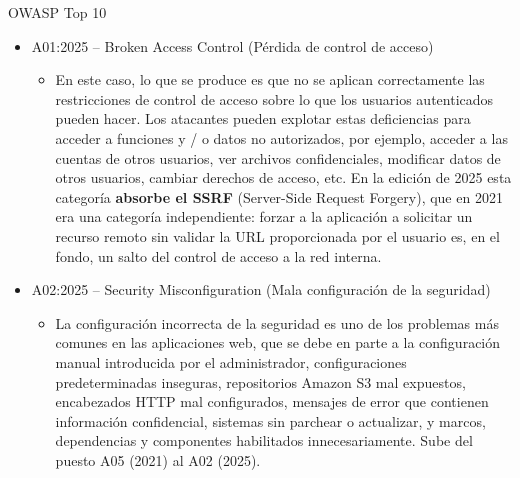 \documentclass[aspectratio=169,10pt]{beamer}
\begin{document}
\begin{frame}[allowframebreaks]{OWASP Top 10}
\small
  \begin{itemize}
  \item A01:2025 -- Broken Access Control (Pérdida de control de acceso)
  \begin{itemize}

  \item En este caso, lo que se produce es que no se aplican correctamente las restricciones de control de acceso sobre lo que los usuarios autenticados pueden hacer. Los atacantes pueden explotar estas deficiencias para acceder a funciones y / o datos no autorizados, por ejemplo, acceder a las cuentas de otros usuarios, ver archivos confidenciales, modificar datos de otros usuarios, cambiar derechos de acceso, etc. En la edición de 2025 esta categoría \textbf{absorbe el SSRF} (Server-Side Request Forgery), que en 2021 era una categoría independiente: forzar a la aplicación a solicitar un recurso remoto sin validar la URL proporcionada por el usuario es, en el fondo, un salto del control de acceso a la red interna.
    \end{itemize}

  \item A02:2025 -- Security Misconfiguration (Mala configuración de la seguridad)
  \begin{itemize}
  \item La configuración incorrecta de la seguridad es uno de los problemas más comunes en las aplicaciones web, que se debe en parte a la configuración manual introducida por el administrador, configuraciones predeterminadas inseguras, repositorios Amazon S3 mal expuestos, encabezados HTTP mal configurados, mensajes de error que contienen información confidencial, sistemas sin parchear o actualizar, y marcos, dependencias y componentes habilitados innecesariamente. Sube del puesto A05 (2021) al A02 (2025).
  \end{itemize}
\end{itemize}
\end{frame}
\end{document}
